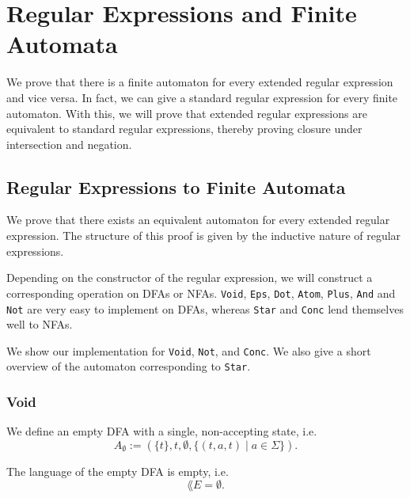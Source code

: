 
\section{Regular Expressions and Finite Automata}

 
We prove that there is a finite automaton for every extended regular expression and vice versa. 
In fact, we can give a standard regular expression for every finite automaton.
With this, we will prove that extended regular expressions are equivalent to standard regular expressions, 
thereby proving closure under intersection and negation.


\subsection{Regular Expressions to Finite Automata}

 
We prove that there exists an equivalent automaton for every extended regular expression.
The structure of this proof is given by the inductive nature of regular expressions.


Depending on the constructor of the regular expression, we will construct a corresponding operation on DFAs or NFAs.
\lstinline{Void}, \lstinline{Eps}, \lstinline{Dot}, \lstinline{Atom}, \lstinline{Plus}, \lstinline{And} and \lstinline{Not} are very easy to implement on DFAs, whereas \lstinline{Star} and \lstinline{Conc} lend themselves well to NFAs.

We show our implementation for \lstinline{Void}, \lstinline{Not}, and \lstinline{Conc}.
We also give a short overview of the automaton corresponding to \lstinline{Star}. 

\subsubsection{Void}
\begin{definition}
    We define an empty DFA with a single, non-accepting state, i.e.
    \begin{equation*}
        A_\emptyset := (\{t\}, t, \emptyset, \{(t, a, t) \; | \; a \in \Sigma\}).
    \end{equation*}
\end{definition}

\begin{lemma}
    \label{dfa_empty_correct}
    The language of the empty DFA is empty, i.e.
    \begin{equation*}
        \lang{E} = \emptyset.
    \end{equation*}
\end{lemma}

